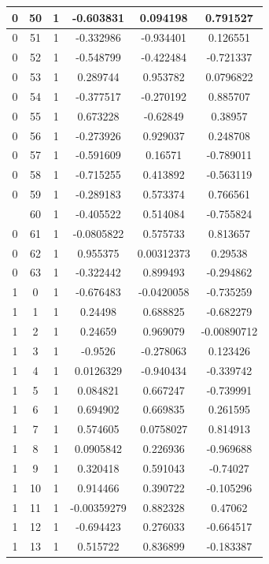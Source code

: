 \documentclass[12pt,a4paper]{article}
\numberwithin{equation}{section}
\numberwithin{figure}{section}
\numberwithin{table}{section}
\begin{document}
\begin{longtable}{|c|c|c|c|c|c|}
0 & 50 & 1 & -0.603831 & 0.094198 & 0.791527 \\ \hline
0 & 51 & 1 & -0.332986 & -0.934401 & 0.126551 \\ \hline
0 & 52 & 1 & -0.548799 & -0.422484 & -0.721337 \\ \hline
0 & 53 & 1 & 0.289744 & 0.953782 & 0.0796822 \\ \hline
0 & 54 & 1 & -0.377517 & -0.270192 & 0.885707 \\ \hline
0 & 55 & 1 & 0.673228 & -0.62849 & 0.38957 \\ \hline
0 & 56 & 1 & -0.273926 & 0.929037 & 0.248708 \\ \hline
0 & 57 & 1 & -0.591609 & 0.16571 & -0.789011 \\ \hline
0 & 58 & 1 & -0.715255 & 0.413892 & -0.563119 \\ \hline
0 & 59 & 1 & -0.289183 & 0.573374 & 0.766561 \\ \hline
\pagebreak
0 & 60 & 1 & -0.405522 & 0.514084 & -0.755824 \\ \hline
0 & 61 & 1 & -0.0805822 & 0.575733 & 0.813657 \\ \hline
0 & 62 & 1 & 0.955375 & 0.00312373 & 0.29538 \\ \hline
0 & 63 & 1 & -0.322442 & 0.899493 & -0.294862 \\ \hline
1 & 0 & 1 & -0.676483 & -0.0420058 & -0.735259 \\ \hline
1 & 1 & 1 & 0.24498 & 0.688825 & -0.682279 \\ \hline
1 & 2 & 1 & 0.24659 & 0.969079 & -0.00890712 \\ \hline
1 & 3 & 1 & -0.9526 & -0.278063 & 0.123426 \\ \hline
1 & 4 & 1 & 0.0126329 & -0.940434 & -0.339742 \\ \hline
1 & 5 & 1 & 0.084821 & 0.667247 & -0.739991 \\ \hline
1 & 6 & 1 & 0.694902 & 0.669835 & 0.261595 \\ \hline
1 & 7 & 1 & 0.574605 & 0.0758027 & 0.814913 \\ \hline
1 & 8 & 1 & 0.0905842 & 0.226936 & -0.969688 \\ \hline
1 & 9 & 1 & 0.320418 & 0.591043 & -0.74027 \\ \hline
1 & 10 & 1 & 0.914466 & 0.390722 & -0.105296 \\ \hline
1 & 11 & 1 & -0.00359279 & 0.882328 & 0.47062 \\ \hline
1 & 12 & 1 & -0.694423 & 0.276033 & -0.664517 \\ \hline
1 & 13 & 1 & 0.515722 & 0.836899 & -0.183387 \\ \hline

\end{longtable}
\end{document}
